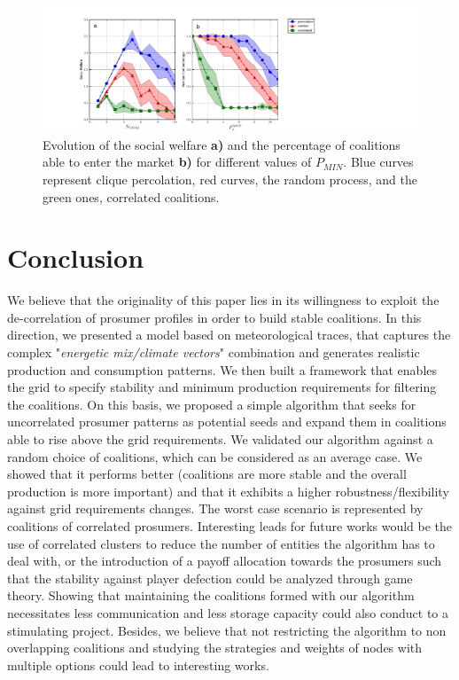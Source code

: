 \documentclass[conference]{IEEEtran}
\begin{document}
\begin{figure}
 \centering
  \includegraphics[scale=0.3]{figure8/fig8.pdf}
  \caption{Evolution of the social welfare \textbf{a)} and the percentage of coalitions able to enter the market \textbf{b)} for different values of $ P_{MIN} $. Blue curves represent clique percolation, red curves, the random process, and the green ones, correlated coalitions.}
 \label{Fig4}
\end{figure}


%
%
\section{Conclusion}
\label{sec:conclusion}

We believe that the originality of this paper lies in its willingness to exploit the de-correlation of prosumer profiles in order to build stable coalitions. In this direction, we presented a model based on meteorological traces, that captures the complex "\textit{energetic mix/climate vectors}" combination and generates realistic production and consumption patterns. We then built a framework that enables the grid to specify stability and minimum production requirements for filtering the coalitions. On this basis, we proposed a simple algorithm that seeks for uncorrelated prosumer patterns as potential seeds and expand them in coalitions able to rise above the grid requirements. We validated our algorithm against a random choice of coalitions, which can be considered as an average case. We showed  that it performs better (coalitions are more stable and the overall production is more important) and that it exhibits a higher robustness/flexibility against grid requirements changes. The worst case scenario is represented by coalitions of correlated prosumers. Interesting leads for future works would be the use of correlated clusters to reduce the number of entities the algorithm has to deal with, or the introduction of a payoff allocation towards the prosumers such that the stability against player defection could be analyzed through game theory. Showing that maintaining the coalitions formed with our algorithm necessitates less communication and less storage capacity could also conduct to a stimulating project. Besides, we believe that not restricting the algorithm to non overlapping coalitions and studying the strategies and weights of nodes with multiple options could lead to interesting works.



%
%
 
  

\end{document}
